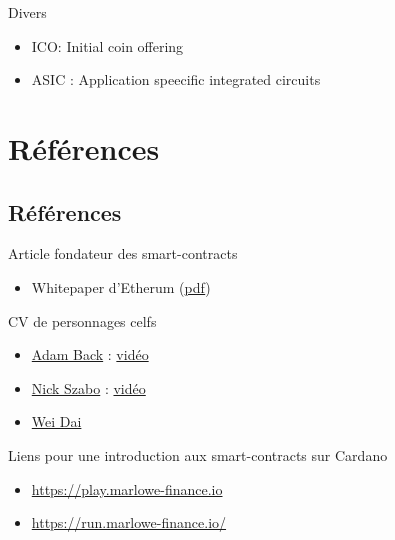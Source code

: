 \documentclass[presentation]{beamer}
\begin{document}
\begin{frame}[label={sec:orgdfc7ef5}]{Divers}
\begin{itemize}
\item ICO: Initial coin offering
\item ASIC : Application speecific integrated circuits
\end{itemize}
\end{frame}


\section{Références}
\label{sec:org856e539}
\subsection{Références}
\label{sec:orgc35cef7}
\begin{frame}[label={sec:orgf2a873b}]{}
\begin{block}{Article fondateur des smart-contracts}
\begin{itemize}
\item Whitepaper d'Etherum (\href{https://ethereum.org/669c9e2e2027310b6b3cdce6e1c52962/Ethereum\_Whitepaper\_-\_Buterin\_2014.pdf}{pdf})
\end{itemize}
\end{block}

\begin{block}{CV de personnages celfs}
\begin{itemize}
\item \href{https://en.bitcoinwiki.org/wiki/Adam\_Back}{Adam Back} :  \href{https://www.youtube.com/watch?v=HEZAlNBJjA0}{vidéo}
\item \href{https://en.bitcoinwiki.org/wiki/Nick\_Szabo}{Nick Szabo} : \href{https://www.youtube.com/watch?v=tWuN2R2DC6c}{vidéo}
\item \href{https://en.bitcoinwiki.org/wiki/Wei\_Dai}{Wei Dai}
\end{itemize}
\end{block}
\begin{block}{Liens pour une introduction aux smart-contracts sur Cardano}
\begin{itemize}
\item \url{https://play.marlowe-finance.io}
\item \url{https://run.marlowe-finance.io/}
\end{itemize}
\end{block}
\end{frame}
\end{document}
